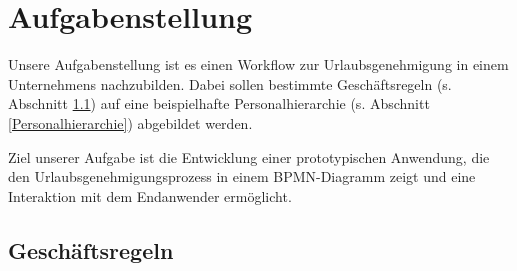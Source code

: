 \section{Aufgabenstellung}
Unsere Aufgabenstellung ist es einen Workflow zur Urlaubsgenehmigung in einem Unternehmens nachzubilden. Dabei sollen bestimmte Geschäftsregeln (s. Abschnitt \ref{Geschäftsregeln}) auf eine beispielhafte Personalhierarchie (s. Abschnitt \ref{Personalhierarchie}) abgebildet werden.

Ziel unserer Aufgabe ist die Entwicklung einer prototypischen Anwendung, die den Urlaubsgenehmigungsprozess in einem BPMN-Diagramm zeigt und eine Interaktion mit dem Endanwender ermöglicht.

\subsection{Geschäftsregeln}
\label{Geschäftsregeln}

